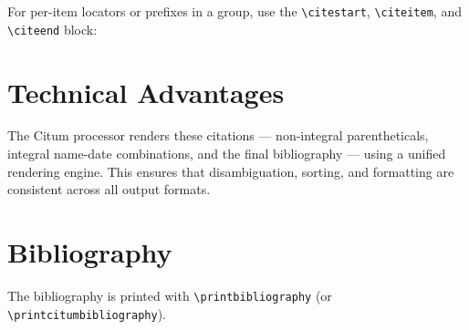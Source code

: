 \documentclass{article}
\begin{document}
For per-item locators or prefixes in a group, use the \verb|\citestart|, 
\verb|\citeitem|, and \verb|\citeend| block:
\citestart
\citeend

\section{Technical Advantages}

The Citum processor renders these citations --- non-integral parentheticals, 
integral name-date combinations, and the final bibliography --- using a 
unified rendering engine. This ensures that disambiguation, sorting, and 
formatting are consistent across all output formats.

\section{Bibliography}

The bibliography is printed with \verb|\printbibliography| (or 
\verb|\printcitumbibliography|).

\printbibliography
\end{document}
